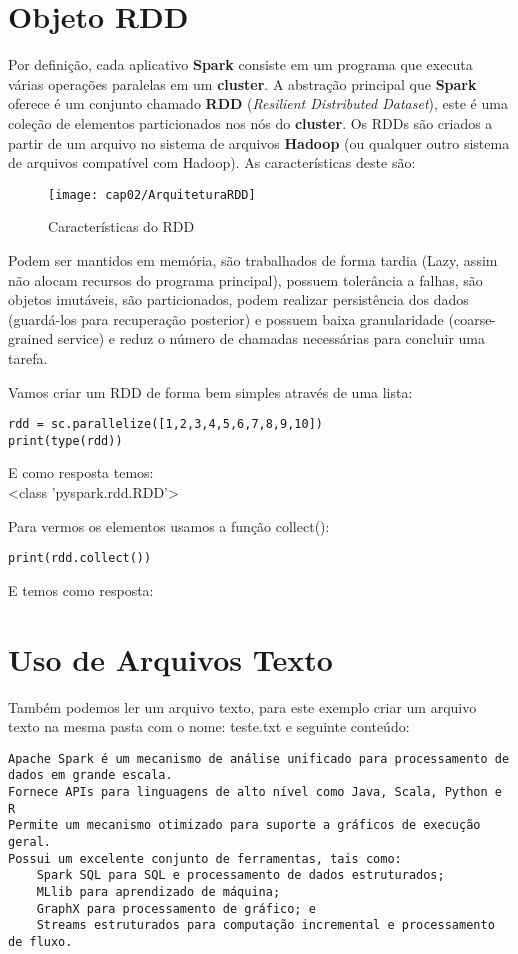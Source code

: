 \section{Objeto RDD}
Por definição, cada aplicativo \textbf{Spark} consiste em um programa que executa várias operações paralelas em um \textbf{cluster}. A abstração principal que \textbf{Spark} oferece é um conjunto chamado \textbf{RDD} (\textit{Resilient Distributed Dataset}), este é uma coleção de elementos particionados nos nós do \textbf{cluster}. Os RDDs são criados a partir de um arquivo no sistema de arquivos \textbf{Hadoop} (ou qualquer outro sistema de arquivos compatível com Hadoop). As características deste são:
\begin{figure}[H]
	\centering\texttt{[image: cap02/ArquiteturaRDD]}
	\caption{Características do RDD}
\end{figure}

Podem ser mantidos em memória, são trabalhados de forma tardia (Lazy, assim não alocam recursos do programa principal), possuem tolerância a falhas, são objetos imutáveis, são particionados, podem realizar persistência dos dados (guardá-los para recuperação posterior) e possuem baixa granularidade (coarse-grained service) e reduz o número de chamadas necessárias para concluir uma tarefa.

Vamos criar um RDD de forma bem simples através de uma lista:
\begin{lstlisting}[]
rdd = sc.parallelize([1,2,3,4,5,6,7,8,9,10])
print(type(rdd))
\end{lstlisting}

E como resposta temos: \\
{\ttfamily <class 'pyspark.rdd.RDD'>}

Para vermos os elementos usamos a função collect():
\begin{lstlisting}[]
print(rdd.collect())
\end{lstlisting}

E temos como resposta: \\
{\ttfamily [1, 2, 3, 4, 5, 6, 7, 8, 9, 10]}

\section{Uso de Arquivos Texto}
Também podemos ler um arquivo texto, para este exemplo criar um arquivo texto na mesma pasta com o nome: teste.txt e seguinte conteúdo:
\begin{lstlisting}[]
Apache Spark é um mecanismo de análise unificado para processamento de dados em grande escala.
Fornece APIs para linguagens de alto nível como Java, Scala, Python e R
Permite um mecanismo otimizado para suporte a gráficos de execução geral.
Possui um excelente conjunto de ferramentas, tais como:
    Spark SQL para SQL e processamento de dados estruturados;
    MLlib para aprendizado de máquina;
    GraphX para processamento de gráfico; e
    Streams estruturados para computação incremental e processamento de fluxo.
\end{lstlisting}

